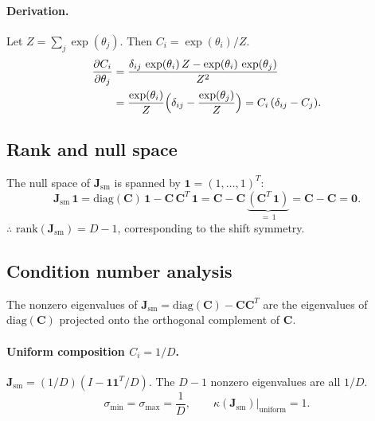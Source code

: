 \documentclass[11pt]{article}
\newcommand{\CC}{\mathbf{C}}
\newcommand{\JJ}{\mathbf{J}}
\newcommand{\ones}{\mathbf{1}}
\begin{document}
\paragraph{Derivation.}
Let $Z = \sum_j \exp(\theta_j)$.  Then $C_i = \exp(\theta_i)/Z$.
%
\begin{align}
  \frac{\partial C_i}{\partial \theta_j}
  &= \frac{\delta_{ij}\,\exp(\theta_i)\,Z - \exp(\theta_i)\,\exp(\theta_j)}{Z^2}
  \nonumber\\
  &= \frac{\exp(\theta_i)}{Z}\Bigl(\delta_{ij} - \frac{\exp(\theta_j)}{Z}\Bigr)
  = C_i\,(\delta_{ij} - C_j).
  \label{eq:jacobian-derivation}
\end{align}


\subsection{Rank and null space}

The null space of $\JJ_\mathrm{sm}$ is spanned by $\ones = (1,\ldots,1)^T$:
%
\begin{equation}
  \JJ_\mathrm{sm}\,\ones
  = \mathrm{diag}(\CC)\,\ones - \CC\,\CC^T\,\ones
  = \CC - \CC\,\underbrace{(\CC^T\,\ones)}_{=\,1}
  = \CC - \CC = \mathbf{0}.
\end{equation}
%
$\therefore$ $\mathrm{rank}(\JJ_\mathrm{sm}) = D - 1$, corresponding to the
shift symmetry.

\subsection{Condition number analysis}

The nonzero eigenvalues of $\JJ_\mathrm{sm} = \mathrm{diag}(\CC) - \CC\CC^T$
are the eigenvalues of $\mathrm{diag}(\CC)$ projected onto the orthogonal
complement of $\CC$.

\paragraph{Uniform composition $C_i = 1/D$.}
$\JJ_\mathrm{sm} = (1/D)(I - \ones\ones^T/D)$.  The $D-1$ nonzero
eigenvalues are all $1/D$.
%
\begin{equation}
  \sigma_\mathrm{min} = \sigma_\mathrm{max} = \frac{1}{D},
  \qquad
  \kappa(\JJ_\mathrm{sm})\big|_\mathrm{uniform} = 1.
\end{equation}
\end{document}
